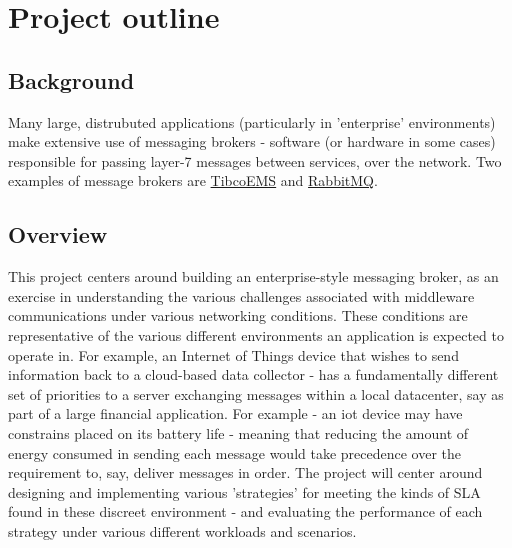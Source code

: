 \section{Project outline}
\label{sec:Project outline}

\subsection{Background}
\label{sub:Background}

Many large, distrubuted applications (particularly in 'enterprise' environments)
make extensive use of messaging brokers -
software (or hardware in some cases\cite{solaceappliances}) responsible for passing
layer-7 messages between services, over the network. Two examples of message
brokers are
\href{http://www.tibco.com/products/automation/enterprise-messaging/enterprise-message-service}{TibcoEMS}
and \href{https://www.rabbitmq.com/}{RabbitMQ}.

\subsection{Overview}
\label{sub:Overview}

This project centers around building an enterprise-style messaging broker,
as an exercise in understanding the various challenges associated with middleware
communications under various networking conditions. These conditions are
representative of the various different environments an application is expected
to operate in. For example, an Internet of Things device that wishes to send information back
to a cloud-based data collector - has a fundamentally different set of priorities
to a server exchanging messages within a local datacenter, say as part of a large
financial application. For example - an \gls{iot} device may
have constrains placed on its battery life - meaning that reducing the amount of
energy consumed in sending each message would take precedence over the
requirement to, say, deliver messages in order. The project will center around
designing and implementing various 'strategies' for meeting the kinds of SLA
found in these discreet environment - and evaluating the performance of each
strategy under various different workloads and scenarios.
